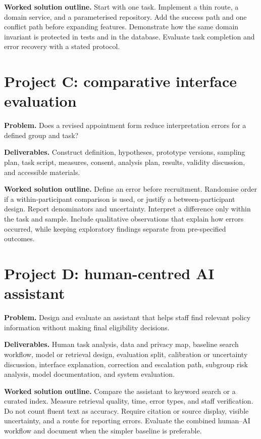 \textbf{Worked solution outline.} Start with one task. Implement a thin route, a domain service, and a parameterised repository. Add the success path and one conflict path before expanding features. Demonstrate how the same domain invariant is protected in tests and in the database. Evaluate task completion and error recovery with a stated protocol.

\section{Project C: comparative interface evaluation}
\textbf{Problem.} Does a revised appointment form reduce interpretation errors for a defined group and task?

\textbf{Deliverables.} Construct definition, hypotheses, prototype versions, sampling plan, task script, measures, consent, analysis plan, results, validity discussion, and accessible materials.

\textbf{Worked solution outline.} Define an error before recruitment. Randomise order if a within-participant comparison is used, or justify a between-participant design. Report denominators and uncertainty. Interpret a difference only within the task and sample. Include qualitative observations that explain how errors occurred, while keeping exploratory findings separate from pre-specified outcomes.

\section{Project D: human-centred AI assistant}
\textbf{Problem.} Design and evaluate an assistant that helps staff find relevant policy information without making final eligibility decisions.

\textbf{Deliverables.} Human task analysis, data and privacy map, baseline search workflow, model or retrieval design, evaluation split, calibration or uncertainty discussion, interface explanation, correction and escalation path, subgroup risk analysis, model documentation, and system evaluation.

\textbf{Worked solution outline.} Compare the assistant to keyword search or a curated index. Measure retrieval quality, time, error types, and staff verification. Do not count fluent text as accuracy. Require citation or source display, visible uncertainty, and a route for reporting errors. Evaluate the combined human--AI workflow and document when the simpler baseline is preferable.

